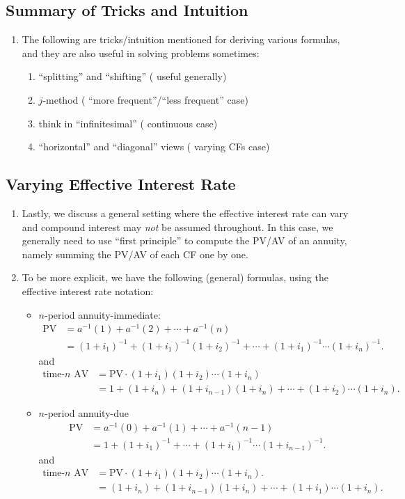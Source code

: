 \subsection{Summary of Tricks and Intuition}
\begin{enumerate}
\item The following are tricks/intuition mentioned for deriving various
formulas, and they are also useful in solving problems sometimes:
\begin{enumerate}
\item ``splitting'' and ``shifting'' ( useful generally)
\item \(j\)-method ( ``more frequent''/``less frequent'' case)
\item think in ``infinitesimal'' ( continuous case)
\item ``horizontal'' and ``diagonal'' views ( varying CFs case)
\end{enumerate}
\end{enumerate}
\subsection{Varying Effective Interest Rate}
\begin{enumerate}
\item Lastly, we discuss a general setting where the effective interest rate
can vary and compound interest may \emph{not} be assumed throughout. In this
case, we generally need to use ``first principle'' to compute the PV/AV of an
annuity, namely summing the PV/AV of each CF one by one.
\item \label{it:pv-av-annuities-varying-effective}
To be more explicit, we have the following (general) formulas, using the
effective interest rate notation:
\begin{itemize}
\item \(n\)-period annuity-immediate:
\begin{align*}
\text{PV}&=a^{-1}(1)+a^{-1}(2)+\dotsb+a^{-1}(n) \\
&=\boxed{(1+i_1)^{-1}+(1+i_1)^{-1}(1+i_2)^{-1}+\dotsb+(1+i_1)^{-1}\dotsb(1+i_n)^{-1}}.
\end{align*}
and
\begin{align*}
\text{time-\(n\) AV}&=\text{PV}\cdot(1+i_1)(1+i_2)\dotsb(1+i_n) \\
&=\boxed{1+(1+i_{n})+(1+i_{n-1})(1+i_{n})+\dotsb+(1+i_2)\dotsb(1+i_{n})}.
\end{align*}
\item \(n\)-period annuity-due
\begin{align*}
\text{PV}&=a^{-1}(0)+a^{-1}(1)+\dotsb+a^{-1}(n-1) \\
&=\boxed{1+(1+i_1)^{-1}+\dotsb+(1+i_1)^{-1}\dotsb(1+i_{n-1})^{-1}}.
\end{align*}
and
\begin{align*}
\text{time-\(n\) AV}&=\text{PV}\cdot(1+i_1)(1+i_2)\dotsb(1+i_n). \\
&=\boxed{(1+i_{n})+(1+i_{n-1})(1+i_{n})+\dotsb+(1+i_1)\dotsb(1+i_{n})}.
\end{align*}
\end{itemize}
\end{enumerate}
